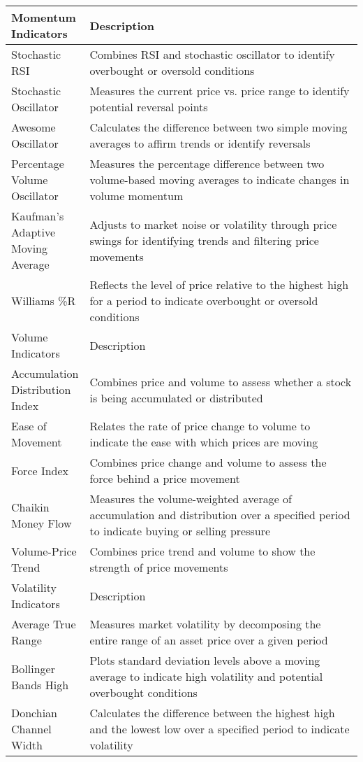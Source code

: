 \documentclass[preprint,12pt,numafflabel,authoryear]{elsarticle}
\begin{document}
\begin{longtable}{ P{0.2\linewidth} P{0.8\linewidth}}
\toprule
Momentum Indicators & Description \\
\hline
Stochastic RSI & Combines RSI and stochastic oscillator to identify overbought or oversold conditions \\
Stochastic Oscillator & Measures the current price vs. price range to identify potential reversal points \\
Awesome Oscillator & Calculates the difference between two simple moving averages to affirm trends or identify reversals \\
Percentage Volume Oscillator & Measures the percentage difference between two volume-based moving averages to indicate changes in volume momentum \\
Kaufman's Adaptive Moving Average & Adjusts to market noise or volatility through price swings for identifying trends and filtering price movements \\
Williams \%R & Reflects the level of price relative to the highest high for a period to indicate overbought or oversold conditions \\
\toprule
Volume Indicators & Description \\
\hline
Accumulation Distribution Index & Combines price and volume to assess whether a stock is being accumulated or distributed \\
Ease of Movement & Relates the rate of price change to volume to indicate the ease with which prices are moving \\
Force Index & Combines price change and volume to assess the force behind a price movement \\
Chaikin Money Flow & Measures the volume-weighted average of accumulation and distribution over a specified period to indicate buying or selling pressure \\
Volume-Price Trend & Combines price trend and volume to show the strength of price movements \\
\toprule
Volatility Indicators & Description \\
\hline
Average True Range & Measures market volatility by decomposing the entire range of an asset price over a given period \\
Bollinger Bands High & Plots standard deviation levels above a moving average to indicate high volatility and potential overbought conditions \\
Donchian Channel Width & Calculates the difference between the highest high and the lowest low over a specified period to indicate volatility \\

\end{longtable}
\end{document}
